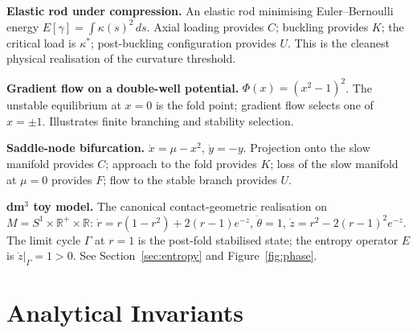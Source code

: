 \documentclass[14pt,a4paper]{extarticle}
\begin{document}
\textbf{Elastic rod under compression.}
An elastic rod minimising Euler--Bernoulli energy
$E[\gamma] = \int \kappa(s)^2\,ds$.
Axial loading provides $C$; buckling provides $K$; the critical load
is $\kappa^*$; post-buckling configuration provides $U$.
This is the cleanest physical realisation of the curvature threshold.

\textbf{Gradient flow on a double-well potential.}
$\Phi(x) = (x^2 - 1)^2$.
The unstable equilibrium at $x = 0$ is the fold point; gradient flow
selects one of $x = \pm 1$.
Illustrates finite branching and stability selection.

\textbf{Saddle-node bifurcation.}
$\dot{x} = \mu - x^2$, $\dot{y} = -y$.
Projection onto the slow manifold provides $C$; approach to the fold
provides $K$; loss of the slow manifold at $\mu = 0$ provides $F$;
flow to the stable branch provides $U$.

\textbf{dm$^3$ toy model.}
The canonical contact-geometric realisation on
$M = S^1 \times \mathbb{R}^+ \times \mathbb{R}$:
$\dot{r} = r(1-r^2) + 2(r-1)e^{-z}$,
$\dot\theta = 1$,
$\dot{z} = r^2 - 2(r-1)^2 e^{-z}$.
The limit cycle $\Gamma$ at $r = 1$ is the post-fold stabilised state;
the entropy operator $E$ is $\dot{z}|_\Gamma = 1 > 0$.
See Section~\ref{sec:entropy} and Figure~\ref{fig:phase}.

\section{Analytical Invariants}
\label{sec:invariants}
\end{document}

